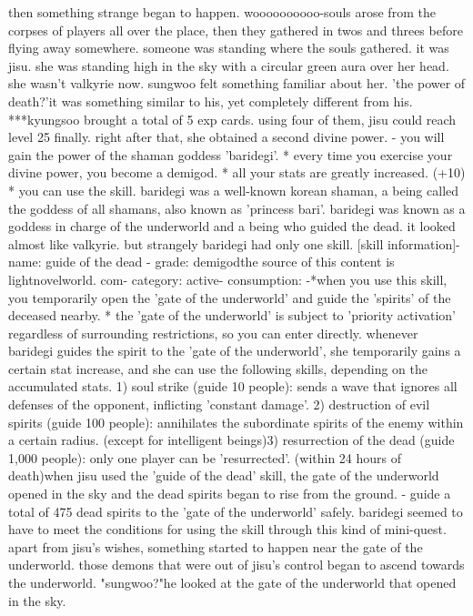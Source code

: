  then something strange began to happen.
woooooooooo-souls arose from the corpses of players all over the place, then they gathered in twos and threes before flying away somewhere.
 someone was standing where the souls gathered.
 it was jisu.
 she was standing high in the sky with a circular green aura over her head.
she wasn't valkyrie now.
 sungwoo felt something familiar about her.
'the power of death?'it was something similar to his, yet completely different from his.
 ***kyungsoo brought a total of 5 exp cards.
 using four of them, jisu could reach level 25 finally.
right after that, she obtained a second divine power.
- you will gain the power of the shaman goddess 'baridegi'.
* every time you exercise your divine power, you become a demigod.
 * all your stats are greatly increased.
 (+10)
* you can use the  skill.
baridegi was a well-known korean shaman, a being called the goddess of all shamans, also known as 'princess bari'.
 baridegi was known as a goddess in charge of the underworld and a being who guided the dead.
 it looked almost like valkyrie.
but strangely baridegi had only one skill.
[skill information]- name: guide of the dead - grade: demigodthe source of this content is lightnov‌elworld.
com- category: active- consumption: -*when you use this skill, you temporarily open the 'gate of the underworld' and guide the 'spirits' of the deceased nearby.
 * the 'gate of the underworld' is subject to 'priority activation' regardless of surrounding restrictions, so you can enter directly.
whenever baridegi guides the spirit to the 'gate of the underworld', she temporarily gains a certain stat increase, and she can use the following skills, depending on the accumulated stats.
 1) soul strike (guide 10 people): sends a wave that ignores all defenses of the opponent, inflicting 'constant damage'.
2) destruction of evil spirits (guide 100 people): annihilates the subordinate spirits of the enemy within a certain radius.
 (except for intelligent beings)3) resurrection of the dead (guide 1,000 people): only one player can be 'resurrected'.
 (within 24 hours of death)when jisu used the 'guide of the dead' skill, the gate of the underworld opened in the sky and the dead spirits began to rise from the ground.
- guide a total of 475 dead spirits to the 'gate of the underworld' safely.
baridegi seemed to have to meet the conditions for using the skill through this kind of mini-quest.
 apart from jisu's wishes, something started to happen near the gate of the underworld.
those demons that were out of jisu's control began to ascend towards the underworld.
"sungwoo?"he looked at the gate of the underworld that opened in the sky.
